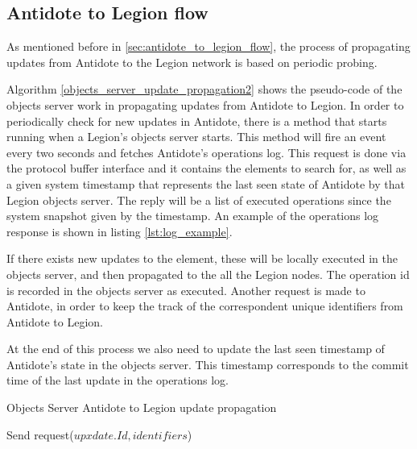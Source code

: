 \subsection{Antidote to Legion flow}
\label{sec:legion_changes_antidote to legion flow}
As mentioned before in \ref{sec:antidote_to_legion_flow}, the process of propagating updates from Antidote to the Legion network is based on periodic probing.\par
	Algorithm \ref{objects_server_update_propagation2} shows the pseudo-code of the objects server work in propagating updates from Antidote to Legion. In order to periodically check for new updates in Antidote, there is a method that starts running when a Legion's objects server starts. This method will fire an event every two seconds and fetches Antidote's operations log. This request is done via the protocol buffer interface and it contains the elements to search for, as well as a given system timestamp that represents the last seen state of Antidote by that Legion objects server. The reply will be a list of executed operations since the system snapshot given by the timestamp. An example of the operations log response is shown in listing \ref{lst:log_example}.\par
	If there exists new updates to the element, these will be locally executed in the objects server, and then propagated to the all the Legion nodes. The operation id is recorded in the objects server as executed. Another request is made to Antidote, in order to keep the track of the correspondent unique identifiers from Antidote to Legion.\par
	At the end of this process we also need to update the last seen timestamp of Antidote's state in the objects server. This timestamp corresponds to the commit time of the last update in the operations log.
	
\begin{algorithm}[H]
\caption{Objects Server Antidote to Legion update propagation}\label{objects_server_update_propagation2}
\begin{algorithmic}[1]
        \State Send request($upxdate.Id, identifiers$)
      \EndFor
\End
\end{algorithmic}
\end{algorithm}
	

